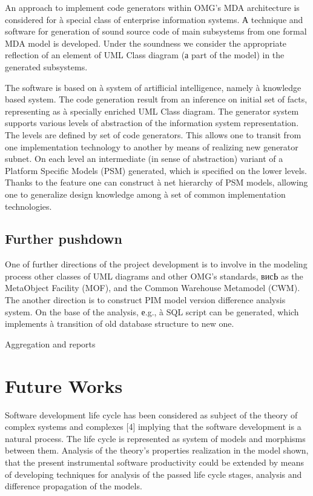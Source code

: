 \documentclass{intech}
\begin{document}
An approach to implement code generators within OMG's MDA architecture is considered for à special class of enterprise information systems. А technique and software for generation of sound source code of main subsystems from one formal MDA model is developed. Under the soundness we consider the appropriate reflection of an element of UML Class diagram (а part of the model) in the generated subsystems.

The software is based on à system of artiflicial intelligence, namely à knowledge based system. The code generation result from an inference on initial set of facts, representing as à specially enriched UML Class diagram. The generator system supports various levels of abstraction of the information system representation. The levels are defined by set of code generators. This allows one to transit from one implementation technology to another by means of realizing new generator subnet. On each level an intermediate (in sense of abstraction) variant of a Platform Specific Models (PSM) generated, which is specified on the lower levels. Thanks to the feature one can construct à net hierarchy of PSM models, allowing one to generalize design knowledge among à set of common implementation technologies.

\subsection{Further pushdown}

One of further directions of the project development is to involve in the modeling process other classes of UML diagrams and other OMG's standards, висЬ as the MetaObject Facility (MOF), and the Common Warehouse Metamodel (CWM). The another direction is to construct PIM model version difference analysis system. On the base of the analysis, е.g., à SQL script can be generated, which implements à transition of old database structure to new one.

Aggregation and reports

\section{Future Works}

Software development life cycle has been considered as subject of the theory of complex systems and complexes [4] implying that the software development is a natural process. The life cycle is represented as system of models and morphisms between them. Analysis of the theory’s properties realization in the model shown, that the present instrumental software productivity could be extended by means of developing techniques for analysis of the passed life cycle stages, analysis and difference propagation of the models.
\end{document}
